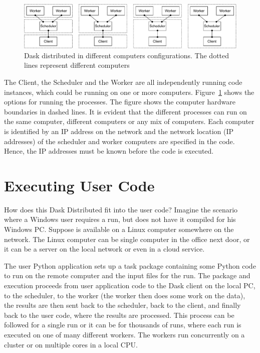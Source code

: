 \begin{figure}[htbp]
    \centering
\includegraphics[width=\textwidth]{pic/daskdistriballoc}
    \caption[Dask distributed in different computers configurations]{Dask distributed in different computers configurations. The dotted lines represent different computers}
    \label{fig:daskdistriballoc}
\end{figure}

The Client, the Scheduler and the Worker are all independently running code instances, which could be running on one or more computers. Figure~\ref{fig:daskdistriballoc} shows the options for running the processes. The figure shows the computer hardware boundaries in dashed lines. It is evident that the different processes can run on the same computer, different computers or any mix of computers.  Each computer is identified by an IP address on the network and the network location (IP addresses) of the scheduler and worker computers are specified in the code. Hence, the IP addresses must be known before the code is executed.


\section{Executing User Code}

How does this Dask Distributed fit into the user code?
Imagine the scenario where a Windows user requires a \libradtran{} run, but does not have it compiled for his Windows PC.  Suppose \libradtran{} is available on a Linux computer somewhere on the network. The Linux computer can be single computer in the office next door, or it can be a server on the local network or even in a cloud service.

The user Python application sets up a task package containing some Python code to run \libradtran{} on the remote computer and the input files for the run. The package and execution proceeds from user application code to the Dask client on the local PC, to the scheduler, to the worker (the worker then does some work on the data), the results are then sent back to the scheduler, back to the client, and finally back to the  user code, where the results are processed.  This process can be followed for  a single \libradtran{} run or it can be for thousands of runs, where each run is executed on one of many different workers.  The workers run concurrently on a cluster or on multiple cores in a local CPU.

